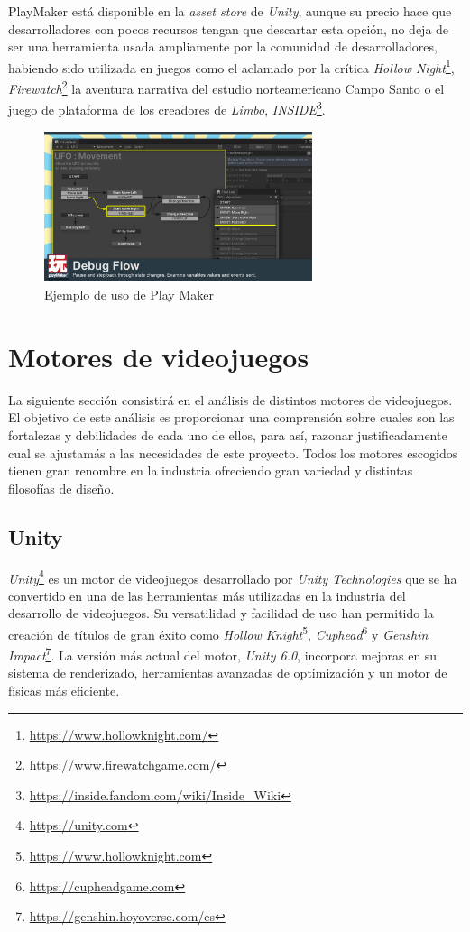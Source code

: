 PlayMaker está disponible en la \textit{asset store} de \textit{Unity}, aunque su precio hace que desarrolladores con pocos recursos tengan que descartar esta opción, no deja de ser una herramienta usada ampliamente por la comunidad de desarrolladores, habiendo sido utilizada en juegos como el aclamado por la crítica \textit{Hollow Night}\footnote{\url{https://www.hollowknight.com/}}, \textit{Firewatch}\footnote{\url{https://www.firewatchgame.com/}} la aventura narrativa del estudio norteamericano Campo Santo o el juego de plataforma de los creadores de \textit{Limbo}, \textit{INSIDE}\footnote{\url{https://inside.fandom.com/wiki/Inside_Wiki}}.\\

\begin{figure}[t]
	\centering
	\includegraphics[width = 0.7\textwidth]{Imagenes/PlayMaker.jpg}
	\caption{Ejemplo de uso de Play Maker}
	\label{fig:PlayMaker_Figure}
\end{figure}

\section{Motores de videojuegos}

La siguiente sección consistirá en el análisis de distintos motores de videojuegos. El objetivo  de este análisis es proporcionar una comprensión sobre cuales son las fortalezas y debilidades de cada uno de ellos, para así, razonar justificadamente cual se ajustamás a las necesidades de este proyecto. Todos los motores escogidos tienen gran renombre en la industria ofreciendo gran variedad y distintas filosofías de diseño.
\subsection{Unity}
\textit{Unity}\footnote{\url{https://unity.com}} es un motor de videojuegos desarrollado por \textit{Unity Technologies} que se ha convertido en una de las herramientas más utilizadas en la industria del desarrollo de videojuegos. Su versatilidad y facilidad de uso han permitido la creación de títulos de gran éxito como \textit{Hollow Knight}\footnote{\url{https://www.hollowknight.com}}, \textit{Cuphead}\footnote{\url{https://cupheadgame.com}} y \textit{Genshin Impact}\footnote{\url{https://genshin.hoyoverse.com/es}}. La versión más actual del motor, \textit{Unity 6.0}, incorpora mejoras en su sistema de renderizado, herramientas avanzadas de optimización y un motor de físicas más eficiente.\\

